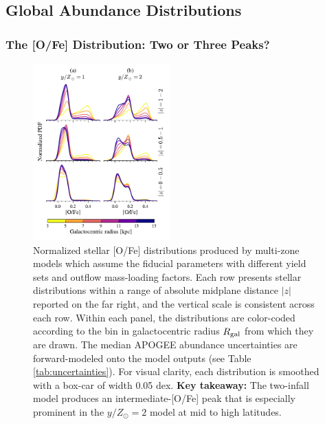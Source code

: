 \documentclass[twocolumn,twocolappendix,linenumbers]{aastex631}
\newcommand{\yZ}[1]{$y/Z_\odot=#1$}
\newcommand{\onecolumn}{0.47\textwidth}
\begin{document}
\subsection{Global Abundance Distributions}
\label{sec:disk-abundances}

\subsubsection{The [O/Fe] Distribution: Two or Three Peaks?}

\begin{figure}
    \centering
    \includegraphics[width=\onecolumn]{src/tex/figures/ofe_distribution_yields.pdf}
    \caption{Normalized stellar [O/Fe] distributions produced by multi-zone models which assume the fiducial parameters with different yield sets and outflow mass-loading factors. Each row presents stellar distributions within a range of absolute midplane distance $|z|$ reported on the far right, and the vertical scale is consistent across each row. Within each panel, the distributions are color-coded according to the bin in galactocentric radius $R_{\rm gal}$ from which they are drawn. The median APOGEE abundance uncertainties are forward-modeled onto the model outputs (see Table \ref{tab:uncertainties}). For visual clarity, each distribution is smoothed with a box-car of width 0.05 dex. {\bf Key takeaway:} The two-infall model produces an intermediate-[O/Fe] peak that is especially prominent in the \yZ{2} model at mid to high latitudes.}
    \label{fig:ofe-distribution-yields}
\end{figure}
\end{document}
